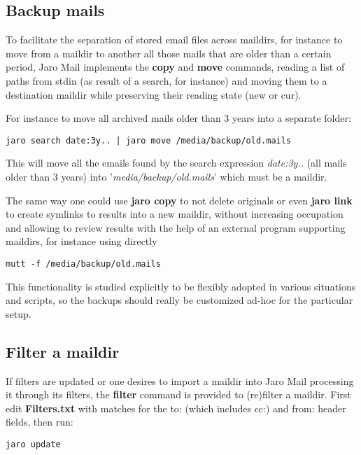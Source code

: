\documentclass[a4,onecolumn,portrait]{article}
\begin{document}
\subsection{Backup mails}
\label{sec-10-2}

To facilitate the separation of stored email files across maildirs, for instance to move from a maildir to another all those mails that are older than a certain period, Jaro Mail implements the \textbf{copy} and \textbf{move} commands, reading a list of paths from stdin (as result of a search, for instance) and moving them to a destination maildir while preserving their reading state (new or cur).

For instance to move all archived mails older than 3 years into a separate folder:

\begin{verbatim}
jaro search date:3y.. | jaro move /media/backup/old.mails
\end{verbatim}

This will move all the emails found by the search expression \emph{date:3y..} (all mails older than 3 years) into '\emph{media/backup/old.mails}' which must be a maildir.

The same way one could use \textbf{jaro copy} to not delete originals or even \textbf{jaro link} to create symlinks to results into a new maildir, without increasing occupation and allowing to review results with the help of an external program supporting maildirs, for instance using directly

\begin{verbatim}
mutt -f /media/backup/old.mails
\end{verbatim}

This functionality is studied explicitly to be flexibly adopted in various situations and scripts, so the backups should really be customized ad-hoc for the particular setup.
\subsection{Filter a maildir}
\label{sec-10-3}

If filters are updated or one desires to import a maildir into Jaro
Mail processing it through its filters, the \textbf{filter} command is
provided to (re)filter a maildir. First edit \textbf{Filters.txt} with matches for the to: (which includes cc:) and from: header fields, then run:

\begin{verbatim}
jaro update
\end{verbatim}
\end{document}
